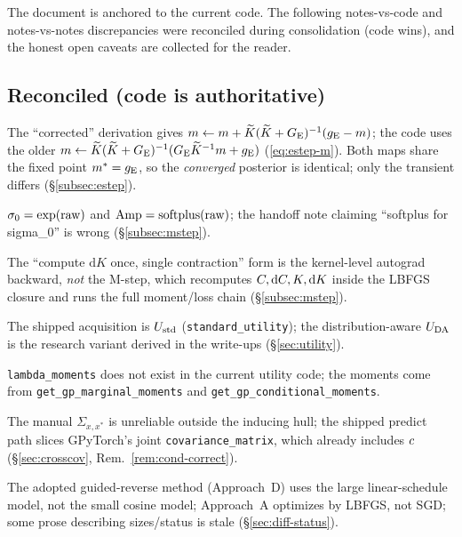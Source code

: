 The document is anchored to the current code. The following notes-vs-code and
notes-vs-notes discrepancies were reconciled during consolidation (code wins),
and the honest open caveats are collected for the reader.

\subsection{Reconciled (code is authoritative)}
\begin{description}[leftmargin=0pt,itemsep=3pt]
  \item[E-step mean update.] The ``corrected'' derivation gives
    $m\leftarrow m+\widetilde{K}(\widetilde{K}+G_{\mathrm{E}})^{-1}(g_{\mathrm{E}}-m)$; the code uses the older
    $m\leftarrow\widetilde{K}(\widetilde{K}+G_{\mathrm{E}})^{-1}(G_{\mathrm{E}}\widetilde{K}^{-1}m+g_{\mathrm{E}})$
    (\eqref{eq:estep-m}). Both maps share the fixed point $m^{*}=g_{\mathrm{E}}$, so the
    \emph{converged} posterior is identical; only the transient differs
    (\S\ref{subsec:estep}).
  \item[Constraint transforms.] $\sigma_{0}=\exp(\text{raw})$ and
    $\mathrm{Amp}=\mathrm{softplus}(\text{raw})$; the handoff note claiming ``softplus for
    sigma\_0'' is wrong (\S\ref{subsec:mstep}).
  \item[Two gradient systems.] The ``compute $\mathrm dK$ once, single
    contraction'' form is the kernel-level autograd backward, \emph{not} the
    M-step, which recomputes $C,\mathrm dC,K,\mathrm dK$ inside the LBFGS
    closure and runs the full moment/loss chain (\S\ref{subsec:mstep}).
  \item[Production utility.] The shipped acquisition is $U_{\mathrm{std}}$
    (\texttt{standard\_utility}); the distribution-aware $U_{\mathrm{DA}}$ is the research
    variant derived in the write-ups (\S\ref{sec:utility}).
  \item[Deprecated helper.] \texttt{lambda\_moments} does not exist in the current
    utility code; the moments come from \texttt{get\_gp\_marginal\_moments} and
    \texttt{get\_gp\_conditional\_moments}.
  \item[Cross-covariance.] The manual $\Sigma_{x,x^{*}}$ is unreliable outside the
    inducing hull; the shipped predict path slices GPyTorch's joint
    \texttt{covariance\_matrix}, which already includes $c$
    (\S\ref{sec:crosscov}, Rem.~\ref{rem:cond-correct}).
  \item[Diffusion specs.] The adopted guided-reverse method (Approach~D) uses the
    large linear-schedule model, not the small cosine model; Approach~A optimizes
    by LBFGS, not SGD; some prose describing sizes/status is stale
    (\S\ref{sec:diff-status}).
\end{description}


